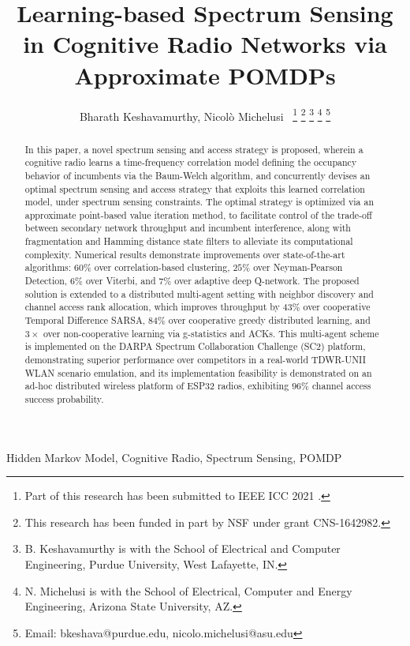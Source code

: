 \documentclass[12pt, draftcls, onecolumn]{IEEEtran}
\title{Learning-based Spectrum Sensing in Cognitive Radio Networks via Approximate POMDPs}
\author{Bharath Keshavamurthy, Nicol\`{o} Michelusi~\IEEEmembership{Senior Member,~IEEE}
\thanks{Part of this research has been submitted to IEEE ICC 2021 \cite{ICC:paper}.}
\thanks{This research has been funded in part by NSF under grant CNS-1642982.}
\thanks{B. Keshavamurthy is with the School of Electrical and Computer Engineering, Purdue University, West Lafayette, IN.}
\thanks{N. Michelusi is with the School of Electrical, Computer and Energy Engineering, Arizona State University, AZ.}
\thanks{Email: bkeshava@purdue.edu, nicolo.michelusi@asu.edu}

\vspace{-12mm}}
\begin{document}
\maketitle
\thispagestyle{plain}
\pagestyle{plain} 

\begin{abstract}
In this paper, a novel spectrum sensing and access strategy is proposed, wherein a cognitive radio learns a time-frequency correlation model defining the occupancy behavior of incumbents via the Baum-Welch algorithm, and concurrently devises an optimal spectrum sensing and access strategy that exploits this learned correlation model, under spectrum sensing constraints. The optimal strategy is optimized via an approximate point-based value iteration method,
to facilitate control of the trade-off between secondary network throughput and incumbent interference,
 along with fragmentation and Hamming distance state filters to alleviate its computational complexity. Numerical results demonstrate improvements
 over state-of-the-art algorithms:
 $60$\%  over correlation-based clustering, $25$\% over Neyman-Pearson Detection, $6$\%  over Viterbi, and $7$\% over adaptive deep Q-network. The proposed solution is extended to a distributed multi-agent setting with neighbor discovery and channel access rank allocation, which improves throughput by $43$\%  over cooperative Temporal Difference SARSA, $84$\% over cooperative greedy distributed learning, and $3\times$ over non-cooperative learning via g-statistics and ACKs. This multi-agent scheme is implemented 
on the DARPA Spectrum Collaboration Challenge (SC2) platform, demonstrating superior performance over competitors in a real-world TDWR-UNII WLAN scenario emulation,
and its implementation feasibility is demonstrated on an ad-hoc distributed wireless platform of ESP32 radios, exhibiting $96$\% channel access success probability.
\end{abstract}

\begin{IEEEkeywords}
Hidden Markov Model, Cognitive Radio, Spectrum Sensing, POMDP
\end{IEEEkeywords}
\end{document}
